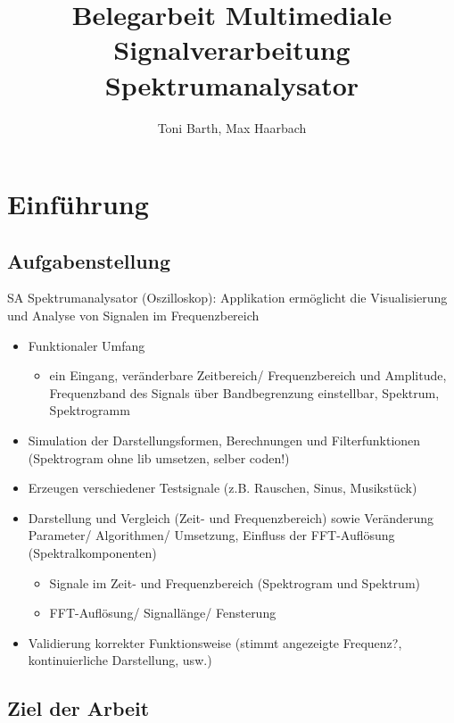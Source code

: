 \documentclass[a4paper]{article}
\title{Belegarbeit Multimediale Signalverarbeitung\\Spektrumanalysator}
\author{Toni Barth, Max Haarbach}
\begin{document}
\maketitle


\newpage
\tableofcontents
\newpage
\listoffigures
\newpage
\section{Einführung}

\subsection{Aufgabenstellung}

SA Spektrumanalysator (Oszilloskop): Applikation ermöglicht die Visualisierung und Analyse von Signalen im Frequenzbereich
\begin{itemize}
  \item Funktionaler Umfang
  \begin{itemize}
    \item ein Eingang, veränderbare Zeitbereich/ Frequenzbereich und Amplitude, Frequenzband des Signals über Bandbegrenzung einstellbar, Spektrum, Spektrogramm
  \end{itemize}
  \item Simulation der Darstellungsformen, Berechnungen und Filterfunktionen (Spektrogram ohne lib umsetzen, selber coden!)
  \item Erzeugen verschiedener Testsignale (z.B. Rauschen, Sinus, Musikstück)
  \item Darstellung und Vergleich (Zeit- und Frequenzbereich) sowie Veränderung Parameter/ Algorithmen/ Umsetzung, Einfluss der FFT-Auflösung (Spektralkomponenten)
  \begin{itemize}
    \item Signale im Zeit- und Frequenzbereich (Spektrogram und Spektrum)
    \item FFT-Auflösung/ Signallänge/ Fensterung
  \end{itemize}
  \item Validierung korrekter Funktionsweise (stimmt angezeigte Frequenz?, kontinuierliche Darstellung, usw.)
\end{itemize}

\subsection{Ziel der Arbeit}
\end{document}
